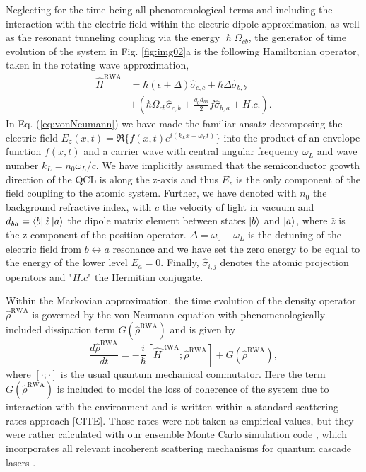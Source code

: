 \documentclass[journal]{IEEEtran}
\def\h{\hat}
\begin{document}
Neglecting for the time being all phenomenological terms and including the interaction with the electric field within the electric dipole approximation, as well as the resonant tunneling coupling via the energy $\hslash\Omega_{cb}$, the generator of time evolution of the system in Fig. \ref{fig:img02}a is the following Hamiltonian operator, taken in the rotating wave approximation,
\begin{align}
\label{eq:hamiltonian-operatorform}
\h{H}^{\text{RWA}} &= \hbar(\epsilon + \Delta) \h\sigma_{c,c} +\hbar\Delta\h\sigma_{b,b}  \nonumber \\ &+ (\hbar\Omega_{cb}\h\sigma_{c,b} +\frac{q_0d_{ba}}{2}f \h\sigma_{b,a}+H.c.).
\end{align}
In Eq. (\ref{eq:vonNeumann}) we have made the familiar ansatz decomposing the electric field $E_z(x,t) = \Re\{f(x,t) e^{i(k_Lx-\omega_L t)}\}$ into the product of an envelope function $f(x,t)$ and a carrier wave with central angular frequency $\omega_L$ and wave number $k_L = n_0\omega_L/c$. We have implicitly assumed that the semiconductor growth direction of the QCL is along the z-axis and thus $E_z$ is the only component of the field coupling to the atomic system. Further, we have denoted with $n_0$ the background refractive index, with $c$ the velocity of light in vacuum and $d_{ba} = \bra{b}\h{z}\ket{a} $ the dipole matrix element between states $\ket{b}$ and $\ket{a}$, where $\h{z}$ is the z-component of the position operator. $\Delta = \omega_0 -\omega_L$ is the detuning of the electric field from $b\leftrightarrow a$ resonance and we have set the zero energy to be equal to the energy of the lower level $E_a = 0$. Finally, $\h \sigma_{i,j}$ denotes the atomic projection operators and "$H.c$" the Hermitian conjugate.

Within the Markovian approximation, the time evolution of the density operator $\h{\rho}^{\text{RWA}}$ is governed by the von Neumann equation with phenomenologically included dissipation term $G(\h{\rho}^{\text{RWA}})$ and is given by
\begin{equation}
\label{eq:vonNeumann}
\frac{d \h{\rho}^{\text{RWA}}}{dt} = -\frac{i}{\hbar}[\h{H}^{\text{RWA}};\h{\rho}^{\text{RWA}}] + G(\h{\rho}^{\text{RWA}}),
\end{equation}
where $[\cdot;\cdot]$ is the usual quantum mechanical commutator. Here the term $G(\h{\rho}^{\text{RWA}})$ is included to model the loss of coherence of the system due to interaction with the environment and is written within a standard scattering rates approach [CITE]. Those rates were not taken as empirical values, but they were rather calculated with our ensemble Monte Carlo simulation code \cite{jirauschek2014modeling}, which incorporates all relevant incoherent scattering mechanisms for quantum cascade lasers \cite{jirauschek2009monte,jirauschek2010monte,jirauschek2010monte_2}.
\end{document}
